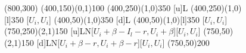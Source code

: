 \documentclass[10.5pt]{article}
\begin{document}
\begin{figure}[h]
\begin{footnotesize}
\begin{center}
\begin{egame}(800,300)
\putbranch(400,150)(0,1){100} 
\putbranch(400,250)(1,0){350} [u]{L}
\putbranch(400,250)(1,0)[l]{350} [$U_{i},U_{i}$]
\putbranch(400,50)(1,0){350} [d]{L}
\putbranch(400,50)(1,0)[l]{350} [$U_{i},U_{i}$]
\putbranch(750,250)(2,1){150}  [u]{L}{N}[$U_{i}+\beta-I_{l}-r,U_{i}+\beta$][$U_{i},U_{i}$]
\putbranch(750,50)(2,1){150}  [d]{L}{N}[$U_{i}+\beta-r,U_{i}+\beta-r $][$U_{i},U_{i}$]
\infoset(750,50){200}{}

\end{egame}
\end{center}
\end{footnotesize}
\end{figure}
\end{document}
